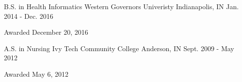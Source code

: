 
\begin{cventries}

  \cventry
    {B.S. in Health Informatics} %
    {Western Governors Univeristy} %
    {Indianapolis, IN} %
    {Jan. 2014 - Dec. 2016} %
    {
      \begin{cvitems} %
        \item {Awarded December 20, 2016}
      \end{cvitems}
    }

  \cventry
    {A.S. in Nursing} %
    {Ivy Tech Community College} %
    {Anderson, IN} %
    {Sept. 2009 - May 2012} %
    {
      \begin{cvitems} %
        \item {Awarded May 6, 2012}
      \end{cvitems}
    }

\end{cventries}
